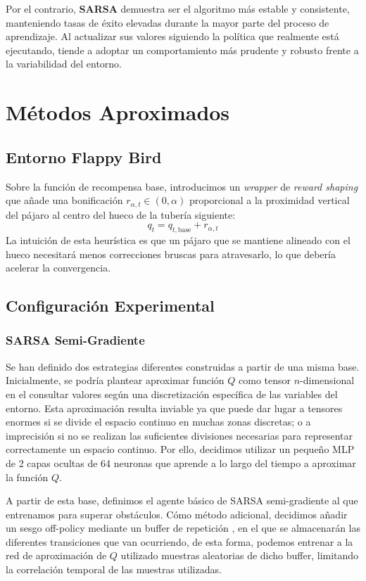 Por el contrario, \textbf{SARSA} demuestra ser el algoritmo más estable y consistente, manteniendo tasas de éxito elevadas durante la mayor parte del proceso de aprendizaje. Al actualizar sus valores siguiendo la política que realmente está ejecutando, tiende a adoptar un comportamiento más prudente y robusto frente a la variabilidad del entorno.

\section{Métodos Aproximados}

\subsection{Entorno Flappy Bird}

Sobre la función de recompensa base, introducimos un \textit{wrapper} de \textit{reward shaping} que añade una bonificación $r_{\alpha,t}\in(0,\alpha)$ proporcional a la proximidad vertical del pájaro al centro del hueco de la tubería siguiente:
$$q_t= q_{t,\text{base}} + r_{\alpha,t}$$
La intuición de esta heurística es que un pájaro que se mantiene alineado con el hueco necesitará menos correcciones bruscas para atravesarlo, lo que debería acelerar la convergencia.

\subsection{Configuración Experimental}

\subsubsection{SARSA Semi-Gradiente}

Se han definido dos estrategias diferentes construidas a partir de una misma base. Inicialmente, se podría plantear aproximar función $Q$ como tensor $n$-dimensional en el consultar valores según una discretización específica de las variables del entorno. Esta aproximación resulta inviable ya que puede dar lugar a tensores enormes si se divide el espacio continuo en muchas zonas discretas; o a imprecisión si no se realizan las suficientes divisiones necesarias para representar correctamente un espacio continuo. Por ello, decidimos utilizar un pequeño MLP de 2 capas ocultas de 64 neuronas que aprende a lo largo del tiempo a aproximar la función $Q$.

A partir de esta base, definimos el agente básico de SARSA semi-gradiente al que entrenamos para superar obstáculos. Cómo método adicional, decidimos añadir un sesgo off-policy mediante un buffer de repetición \cite{mnih2015humanlevel}, en el que se almacenarán las diferentes transiciones que van ocurriendo, de esta forma, podemos entrenar a la red de aproximación de $Q$ utilizado muestras aleatorias de dicho buffer, limitando la correlación temporal de las muestras utilizadas.

